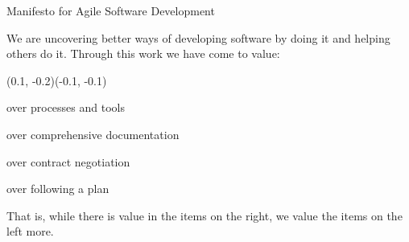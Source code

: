 



\begin{frame}{\large Manifesto for Agile Software Development}

  {\footnotesize \color{black} We are uncovering better ways of developing
  software by doing it and helping others do it.
  Through this work we have come to value:}

  \vfill

  (0.1, -0.2)(-0.1, -0.1)
  \begin{description}
    \begin{small}
      \item [Individuals and interactions] over processes and tools
      \item [Working software] over comprehensive documentation
      \item [Customer collaboration] over contract negotiation
      \item [Responding to change] over following a plan
    \end{small}
  \end{description}

  \vfill

  {\footnotesize That is, while there is value in the items on
  the right, we value the items on the left more.}


\end{frame}
